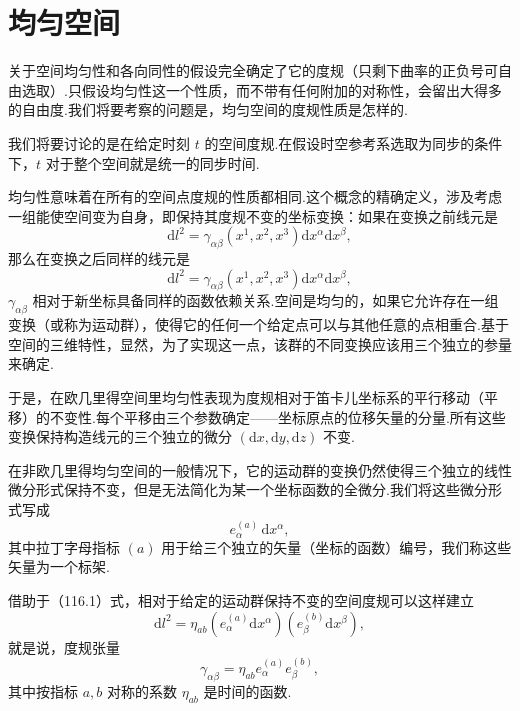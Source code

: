 \section{均匀空间}

关于空间均匀性和各向同性的假设完全确定了它的度规（只剩下曲率的正负号可自由选取）.只假设均匀性这一个性质，而不带有任何附加的对称性，会留出大得多的自由度.我们将要考察的问题是，均匀空间的度规性质是怎样的.

我们将要讨论的是在给定时刻 $t$ 的空间度规.在假设时空参考系选取为同步的条件下，$t$ 对于整个空间就是统一的同步时间.

均匀性意味着在所有的空间点度规的性质都相同.这个概念的精确定义，涉及考虑一组能使空间变为自身，即保持其度规不变的坐标变换：如果在变换之前线元是
\begin{equation*}
  \mathrm{d}l^{2}=\gamma_{\alpha\beta}(x^{1},x^{2},x^{3})
  \mathrm{d}x^{\alpha}\mathrm{d}x^{\beta},
\end{equation*}
那么在变换之后同样的线元是
\begin{equation*}
  \mathrm{d}l^{2}=\gamma_{\alpha\beta}(x^{1},x^{2},x^{3})
  \mathrm{d}x^{\alpha}\mathrm{d}x^{\beta},
\end{equation*}
$\gamma_{\alpha\beta}$ 相对于新坐标具备同样的函数依赖关系.空间是均匀的，如果它允许存在一组变换（或称为运动群），使得它的任何一个给定点可以与其他任意的点相重合.基于空间的三维特性，显然，为了实现这一点，该群的不同变换应该用三个独立的参量来确定.

于是，在欧几里得空间里均匀性表现为度规相对于笛卡儿坐标系的平行移动（平移）的不变性.每个平移由三个参数确定——坐标原点的位移矢量的分量.所有这些变换保持构造线元的三个独立的微分 $(\mathrm{d}x,\mathrm{d}y,\mathrm{d}z)$ 不变.

在非欧几里得均匀空间的一般情况下，它的运动群的变换仍然使得三个独立的线性微分形式保持不变，但是无法简化为某一个坐标函数的全微分.我们将这些微分形式写成
\begin{equation}
  e_{\alpha}^{(a)}\,\mathrm{d}x^{\alpha},
\end{equation}
其中拉丁字母指标 $(a)$ 用于给三个独立的矢量（坐标的函数）编号，我们称这些矢量为一个标架.

借助于（116.1）式，相对于给定的运动群保持不变的空间度规可以这样建立
\begin{equation}
  \mathrm{d}l^{2}=\eta_{ab}
  (e_{\alpha}^{(a)}\mathrm{d}x^{\alpha})
  (e_{\beta}^{(b)}\mathrm{d}x^{\beta}),
\end{equation}
就是说，度规张量
\begin{equation}
  \gamma_{\alpha\beta}=\eta_{ab}e_{\alpha}^{(a)}e_{\beta}^{(b)},
\end{equation}
其中按指标 $a,b$ 对称的系数 $\eta_{ab}$ 是时间的函数.

